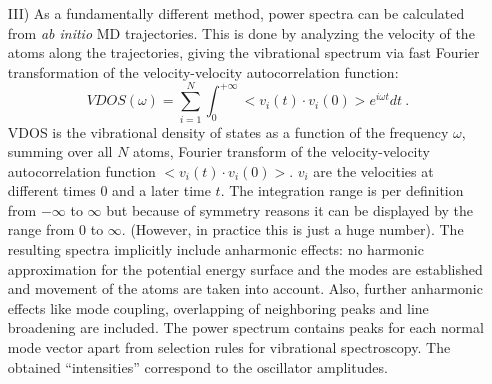 \documentclass[11pt,DIV=13,BCOR=5mm,a4paper,headinclude]{scrbook}
\begin{document}
\begin{itemize}
\item[III)] As a fundamentally different method, power spectra can be calculated from \textit{ab initio} MD trajectories\cite{VAC}.
This is done by analyzing the velocity of the atoms along the trajectories, giving the vibrational spectrum via fast Fourier transformation of the velocity-velocity autocorrelation function:
\begin{equation}
 VDOS(\omega)=\sum_{i=1}^N\int_{0}^{+\infty}<v_i(t)\cdot v_i(0)>e^{i\omega t}dt ~.
\end{equation}
VDOS is the vibrational density of states as a function of the frequency $\omega$, summing over all $N$ atoms, Fourier transform of the velocity-velocity autocorrelation function $<v_i(t)\cdot v_i(0)>$.
$v_i$ are the velocities at different times $0$ and a later time $t$.
The integration range is per definition from $-\infty$ to $\infty$ but because of symmetry reasons it can be displayed by the range from $0$ to $\infty$. (However, in practice this is just a huge number).
The resulting spectra implicitly include anharmonic effects: no harmonic approximation for the potential energy surface and the modes are established and movement of the atoms are taken into account.
Also, further anharmonic effects like mode coupling, overlapping of neighboring peaks and line broadening are included\cite{hornicek2007,hudecova2012}.
The power spectrum contains peaks for each normal mode vector apart from selection rules for vibrational spectroscopy.
The obtained ``intensities'' correspond to the oscillator amplitudes.
\end{itemize}
\end{document}
